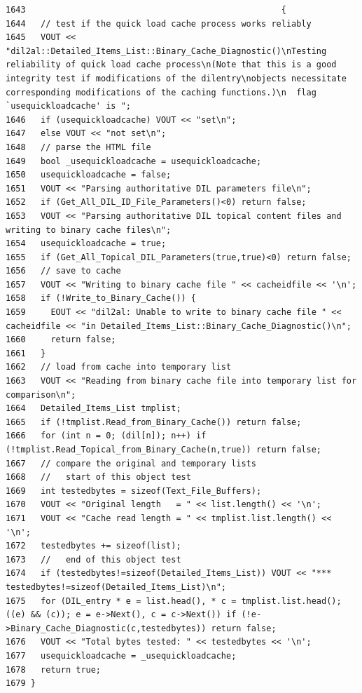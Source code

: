 \footnotesize\begin{verbatim}1643                                                   {
1644   // test if the quick load cache process works reliably
1645   VOUT << "dil2al::Detailed_Items_List::Binary_Cache_Diagnostic()\nTesting reliability of quick load cache process\n(Note that this is a good integrity test if modifications of the dilentry\nobjects necessitate corresponding modifications of the caching functions.)\n  flag `usequickloadcache' is ";
1646   if (usequickloadcache) VOUT << "set\n";
1647   else VOUT << "not set\n";
1648   // parse the HTML file
1649   bool _usequickloadcache = usequickloadcache;
1650   usequickloadcache = false;
1651   VOUT << "Parsing authoritative DIL parameters file\n";
1652   if (Get_All_DIL_ID_File_Parameters()<0) return false;
1653   VOUT << "Parsing authoritative DIL topical content files and writing to binary cache files\n";
1654   usequickloadcache = true;
1655   if (Get_All_Topical_DIL_Parameters(true,true)<0) return false;
1656   // save to cache
1657   VOUT << "Writing to binary cache file " << cacheidfile << '\n';
1658   if (!Write_to_Binary_Cache()) {
1659     EOUT << "dil2al: Unable to write to binary cache file " << cacheidfile << "in Detailed_Items_List::Binary_Cache_Diagnostic()\n";
1660     return false;
1661   }
1662   // load from cache into temporary list
1663   VOUT << "Reading from binary cache file into temporary list for comparison\n";
1664   Detailed_Items_List tmplist;
1665   if (!tmplist.Read_from_Binary_Cache()) return false;
1666   for (int n = 0; (dil[n]); n++) if (!tmplist.Read_Topical_from_Binary_Cache(n,true)) return false;
1667   // compare the original and temporary lists
1668   //   start of this object test
1669   int testedbytes = sizeof(Text_File_Buffers);
1670   VOUT << "Original length   = " << list.length() << '\n';
1671   VOUT << "Cache read length = " << tmplist.list.length() << '\n';
1672   testedbytes += sizeof(list);
1673   //   end of this object test
1674   if (testedbytes!=sizeof(Detailed_Items_List)) VOUT << "*** testedbytes!=sizeof(Detailed_Items_List)\n";
1675   for (DIL_entry * e = list.head(), * c = tmplist.list.head(); ((e) && (c)); e = e->Next(), c = c->Next()) if (!e->Binary_Cache_Diagnostic(c,testedbytes)) return false;
1676   VOUT << "Total bytes tested: " << testedbytes << '\n';
1677   usequickloadcache = _usequickloadcache;
1678   return true;
1679 }
\end{verbatim}\normalsize 
{}
